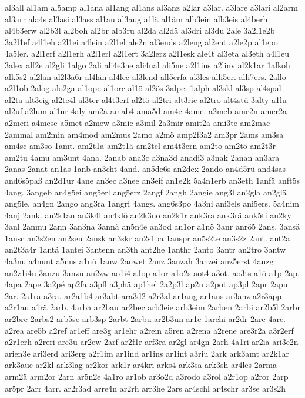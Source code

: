 {al3all
al1am
al5amp
al1ana
al1ang
al1ans
al3anz
a2lar
a3lar.
a3lare
a3lari
al2arm
al3arr
ala4s
al3asi
al3ass
al1au
al3aug
a1lä
al1äm
alb3ein
alb3eis
al4berh
al4b3erw
al2b3l
al2boh
al2br
alb3ru
al2da
al2dä
al3dri
al3du
2ale
3a2l1e2b
3a2l1ef
a4l1eh
a2l1ei
a4lein
a2l1el
ale2n
al3ends
a2leng
al2ent
a2le2p
al1epo
4a5ler.
a2l1erf
a2l1erh
a2l1erl
a2l1ert
3a2lerz
a2l1esk
ale4t
al3eta
al3eth
a4l1eu
3alex
alf2e
al2gli
1algo
2ali
ali4e3ne
ali4nal
ali5ne
a2l1ins
a2linv
al2k1ar
1alkoh
alk5s2
al2lan
al2l3a6r
al4län
al4lec
al3lend
all5erfa
al3les
alli5er.
alli7ers.
2allo
a2l1ob
2alog
alo2ga
al1ope
al1orc
al1ö
al2ös
3alpe.
1alph
al3skl
al3sp
al4spal
al2ta
alt3eig
al2te4l
al3ter
al4t3erf
al2tö
al2tri
alt3ric
al2tro
alt4stü
3alty
a1lu
al2uf
a2lum
al1ur
4aly
am2a
amab4
ama5d
am4e
4ame.
a2meb
ame2n
amer2a
a2meri
a4mese
a5met
a2mew
a3mie
a3mil
2a3mir
amit2a
ami3te
am2mac
2ammal
am2min
am4mod
am2mus
2amo
a2mö
amp2f3a2
am3pr
2ams
am3sa
am4sc
am3so
1amt.
am2t1a
am2t1ä
am2tel
am4t3ern
am2to
am2tö
am2t3r
am2tu
4amu
am3unt
4ana.
2anab
ana3c
a3na3d
anadi3
a3nak
2anan
an3ara
2anas
2anat
an1äs
1anb
an3cht
4and.
an5de6s
an2dex
2ando
an4d5rü
and4sas
and6s5paß
an2d1ur
4ane
an3ec
a3nee
an3eif
an1e2k
5a4n1erb
an3eth
1anfä
anft5s
4ang.
3angeb
an4g5ei
ang5erl
ang5erz
2angf
2angh
2angie
ang3l
an2gla
an2glä
ang5le.
an4gn
2ango
ang3ra
1angri
4angs.
ang6s3po
4a3ni
ani3els
ani5ers.
5a4nim
4anj
2ank.
an2k1an
an3k4l
an4klö
an2k3no
an2k1r
ank3ra
ank3rä
ank5ti
an2ky
3anl
2anmu
2ann
3an3na
3annä
an5n4e
an3od
an1or
a1nö
3anr
anrö5
2ans.
3ansä
1ansc
an3s2en
an2seu
2ansk
an3skr
an2s1pa
1anspr
an5s2te
an3s2z
2ant.
ant2a
an2t3a4r
1antá
1antei
3antenn
an3th
ant2he
1anthr
2anto
3antr
an2tro
3antw
4a3nu
a4nunt
a5nus
a1nü
1anw
2anwet
2anz
3anzah
3anzei
anz5erst
4anzg
an2z1i4n
3anzu
3anzü
an2zw
ao1i4
a1op
a1or
a1o2s
aot4
a3ot.
ao3ts
a1ö
a1p
2ap.
4apa
2ape
3a2pé
ap2fa
a3pfl
a3phä
ap1hel
2a2p3l
ap2n
a2pot
ap3pl
2apr
2apu
2ar.
2a1ra
a3ra.
ar2a1b4
ar3abt
ara3d2
a2r3al
ar1ang
ar1ans
ar3anz
a2r3app
a2r1au
a1rä
2arb.
4arba
ar2bau
ar2bec
arb3eie
arb3eim
2arben
2arbi
ar2b5l
2arbr
ar2bre
2arbs2
arb5se
arb3sp
2arbt
2arbu
ar2b3un
ar1c
1archi
ar2dr
2are
4are.
a2rea
are5b
a2ref
ar1eff
are3g
ar1ehr
a2rein
a5ren
a2rena
a2rene
are3r2a
a3r2erf
a2r1erh
a2reri
are3u
ar2ew
2arf
ar2f1r
arf3ra
ar2gl
ar4gn
2arh
4a1ri
ar2ia
ari3e2n
arien3e
ari3erd
ari3erg
a2r1im
ar1ind
ar1ins
ar1int
a3riu
2ark
ark3amt
ar2k1ar
ark3aue
ar2kl
ark3lag
ar2kor
ark1r
ar4kri
arks4
ark3sa
ark3sh
ar4les
2arma
arm2ä
arm2or
2arn
ar5n2e
4a1ro
ar1ob
ar3o2d
a3rodo
a3rol
a2r1op
a2ror
2arp
ar5pr
2arr
4arr.
ar2r3ad
arre4n
ar2rh
arr3he
2ars
ar4schl
ar4schr
ar3se
ar3s2h
}
